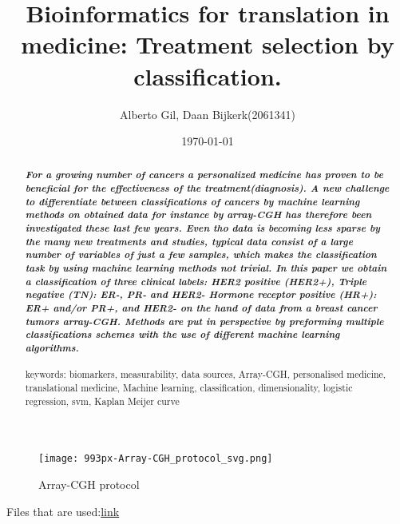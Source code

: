 \documentclass[a4paper]{article}
\author{\vspace{-4ex}}
\date{\vspace{-5ex}}
\title{Bioinformatics for translation in medicine: Treatment selection by classification.}
\author{Alberto Gil, Daan Bijkerk(2061341)}
\date{\today}
\begin{document}
\maketitle
\begin{abstract}


\textbf{\textit{For a growing number of cancers a personalized medicine has proven to be beneficial for the effectiveness of the treatment(diagnosis). A new challenge to differentiate between classifications of cancers by machine learning methods on obtained data for instance by array-CGH has therefore been investigated these last few years. Even tho data is becoming less sparse by the many new treatments and studies, typical data consist of a large number of variables of just a few samples, which makes the classification task by using machine learning methods not trivial. In this paper we obtain a classification of three clinical labels: HER2 positive (HER2+), Triple negative (TN): ER-, PR- and HER2- Hormone receptor positive (HR+): ER+ and/or PR+, and HER2- on the hand of data from a breast cancer tumors array-CGH. Methods are put in perspective by preforming multiple classifications schemes with the use of different machine learning algorithms.\\}}\\ 
keywords: biomarkers, measurability, data sources, Array-CGH, personalised medicine, translational medicine, Machine learning, classification, dimensionality, logistic regression, svm, Kaplan Meijer curve%
\end{abstract}

\begin{figure}[H]
\begin{center}
 \texttt{[image: 993px-Array-CGH\_protocol\_svg.png]}
    \caption{Array-CGH protocol\cite{phil}}
   \label{front}
\end{center}
\end{figure}

Files that are used:\url{link} 



\newpage
\end{document}
